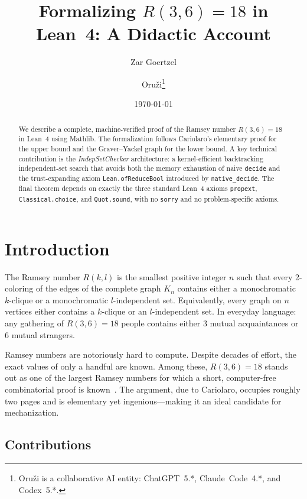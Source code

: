 \documentclass[11pt]{article}
\title{\textbf{Formalizing $R(3,6) = 18$ in Lean~4: A Didactic Account}}
\author{Zar Goertzel \and Oru\v{z}i\thanks{Oru\v{z}i is a collaborative AI entity:
  ChatGPT~5.*, Claude~Code~4.*, and Codex~5.*.}}
\date{\today}
\newcommand{\lean}[1]{\texttt{#1}}
\begin{document}
\maketitle

\begin{abstract}
We describe a complete, machine-verified proof of the Ramsey number $R(3,6) = 18$
in Lean~4 using Mathlib.
The formalization follows Cariolaro's elementary proof for the upper bound
and the Graver--Yackel graph for the lower bound.
A key technical contribution is the \emph{IndepSetChecker} architecture: a
kernel-efficient backtracking independent-set search that avoids both the
memory exhaustion of naive \lean{decide} and the trust-expanding axiom
\lean{Lean.ofReduceBool} introduced by \lean{native\_decide}.
The final theorem depends on exactly the three standard Lean~4 axioms
\lean{propext}, \lean{Classical.choice}, and \lean{Quot.sound},
with no \lean{sorry} and no problem-specific axioms.
\end{abstract}

\tableofcontents
\newpage

\section{Introduction}
\label{sec:intro}

The Ramsey number $R(k,l)$ is the smallest positive integer $n$ such that every
2-coloring of the edges of the complete graph $K_n$ contains either a monochromatic
$k$-clique or a monochromatic $l$-independent set.
Equivalently, every graph on $n$ vertices either contains a $k$-clique or an
$l$-independent set.
In everyday language: any gathering of $R(3,6) = 18$ people contains either
3 mutual acquaintances or 6 mutual strangers.

Ramsey numbers are notoriously hard to compute.
Despite decades of effort, the exact values of only a handful are known.
Among these, $R(3,6) = 18$ stands out as one of the largest Ramsey numbers
for which a short, computer-free combinatorial proof is known~\cite{cariolaro1999}.
The argument, due to Cariolaro, occupies roughly two pages and is elementary
yet ingenious---making it an ideal candidate for mechanization.

\subsection*{Contributions}
\end{document}
